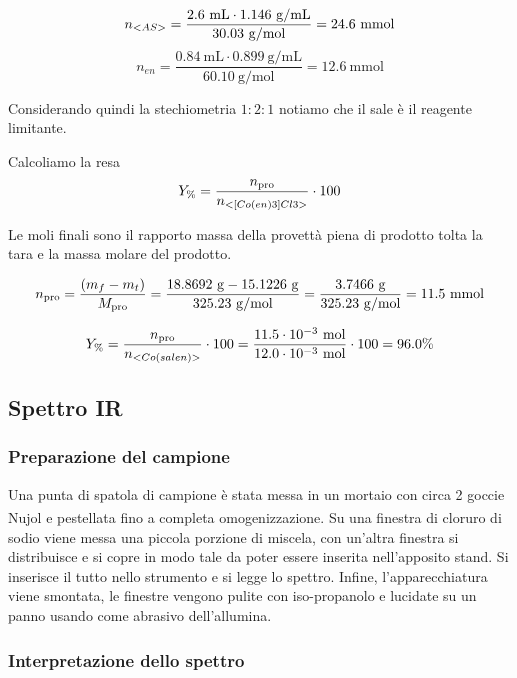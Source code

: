\[ n_{<AS>}=\frac{2.6 \mathrm{~mL} \cdot 1.146 \mathrm{~g} / \mathrm{mL} }{30.03 \mathrm{~g} / \mathrm{mol}}=24.6 \mathrm{~mmol} \]
\[ n_{en}=\frac{0.84 \mathrm{~mL} \cdot 0.899 \mathrm{~g} / \mathrm{mL}}{60.10 \mathrm{~g} / \mathrm{mol}}=12.6 \mathrm{~mmol} \]

Considerando quindi la stechiometria $1: 2: 1$ notiamo che il sale è il reagente limitante. 



Calcoliamo la resa 
\[ Y_\% = \frac{n_\text{pro}}{n_{<[Co(en)3]Cl3>}}\cdot 100 \]

Le moli finali sono il rapporto massa della provettà piena di prodotto tolta la tara e la massa molare del prodotto.

\[ n_\text{pro} = \frac{(m_{f} - m_{t})}{M_\text{pro}} 
 = \frac{ 18.8692 \mathrm{\ g} - 15.1226 \mathrm{\ g} }{ 325.23 \mathrm{\ g/mol}} =  \frac{3.7466 \mathrm{~g}}{325.23 \mathrm{~g} / \mathrm{mol}}=11.5 \mathrm{\ mmol}\]

\[ Y_\% = \frac{n_\text{pro}}{n_{<Co(salen)>}}\cdot 100  = \frac{  11.5 \cdot 10^{-3} \mathrm{~mol}}{12.0 \cdot 10^{-3} \mathrm{~mol}} \cdot 100 =96.0\%\]


\subsection{Spettro IR}


\subsubsection{Preparazione del campione}
Una punta di spatola di campione è stata messa in un mortaio con circa 2 goccie Nujol\textsuperscript{\tiny\textregistered} e pestellata fino a completa omogenizzazione.  Su una finestra di cloruro di sodio viene messa una piccola porzione di miscela, con un'altra finestra si distribuisce e si copre in modo tale da poter essere inserita nell'apposito stand. Si inserisce il tutto nello strumento e si legge lo spettro. Infine, l'apparecchiatura viene smontata, le finestre vengono pulite con iso-propanolo  e lucidate su un panno usando come abrasivo dell'allumina.
\subsubsection{Interpretazione dello spettro}

